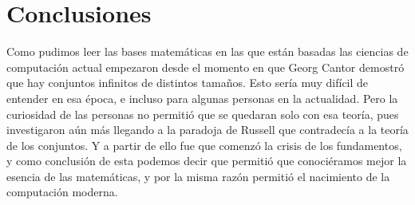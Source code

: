 \documentclass[11pt,letterpaper]{article}
\begin{document}
\section*{Conclusiones}
Como pudimos leer las bases matemáticas en las que están basadas las ciencias de computación actual empezaron desde el momento en que Georg Cantor demostró que hay conjuntos infinitos de distintos tamaños. Esto sería muy difícil de entender en esa época, e incluso para algunas personas en la actualidad. Pero la curiosidad de las personas no permitió que se quedaran solo con esa teoría, pues investigaron aún más llegando a la paradoja de Russell que contradecía a la teoría de los conjuntos. Y a partir de ello fue que comenzó la crisis de los fundamentos, y como conclusión de esta podemos decir que permitió que conociéramos mejor la esencia de las matemáticas, y por la misma razón permitió el nacimiento de la computación moderna.













\end{document}
